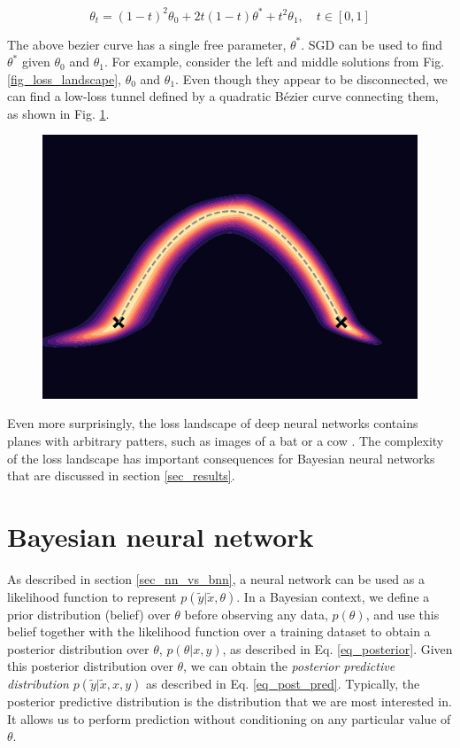 \documentclass[12pt]{article}
\begin{document}
\begin{equation}
\theta_t = (1-t)^2 \theta_0 + 2t(1-t) \theta^* + t^2 \theta_1, \quad t \in [0, 1]
\end{equation}

The above bezier curve has a single free parameter, $\theta^*$. SGD can be used to find $\theta^*$ given $\theta_0$ and $\theta_1$. For example, consider the left and middle solutions from Fig. \ref{fig_loss_landscape}, $\theta_0$ and $\theta_1$. Even though they appear to be disconnected, we can find a low-loss tunnel defined by a quadratic Bézier curve connecting them, as shown in Fig. \ref{fig_mode_connectivity}.

\begin{figure}[ht]
\centering
\includegraphics[width=12cm]{plots/mode_connectivity.pdf}
\caption{}
\label{fig_mode_connectivity}
\end{figure}

Even more surprisingly, the loss landscape of deep neural networks contains planes with arbitrary patters, such as images of a bat or a cow \cite{sightseeing}. The complexity of the loss landscape has important consequences for Bayesian neural networks that are discussed in section \ref{sec_results}.

\section{Bayesian neural network}

As described in section \ref{sec_nn_vs_bnn}, a neural network can be used as a likelihood function to represent $p(\tilde{y} | \tilde{x}, \theta)$. In a Bayesian context, we define a prior distribution (belief) over $\theta$ before observing any data, $p(\theta)$, and use this belief together with the likelihood function over a training dataset to obtain a posterior distribution over $\theta$, $p(\theta | x, y)$, as described in Eq. \ref{eq_posterior}. Given this posterior distribution over $\theta$, we can obtain the \textit{posterior predictive distribution} $p(\tilde{y} | \tilde{x}, x, y)$ as described in Eq. \ref{eq_post_pred}. Typically, the posterior predictive distribution is the distribution that we are most interested in. It allows us to perform prediction without conditioning on any particular value of $\theta$.
\end{document}

